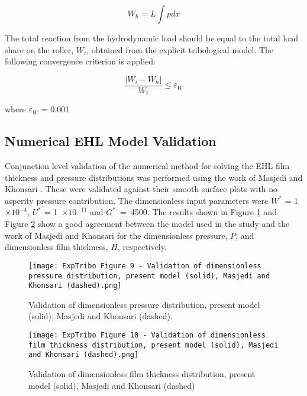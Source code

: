 \begin{enumerate}
	\begin{equation}\label{Reaction load integration EHL}
		W_h=L \int p d x
	\end{equation}

	The total reaction from the hydrodynamic load should be equal to the total load share on the roller, $W_i$, obtained from the explicit tribological model. The following convergence criterion is applied:
	
	\begin{equation}
		\frac{\left|W_i-W_h\right|}{W_i} \leq \varepsilon_W
	\end{equation}

	where $\varepsilon_W$ = 0.001 
\end{enumerate}

\subsection{Numerical EHL Model Validation}
Conjunction level validation of the numerical method for solving the EHL film thickness and pressure distributions was performed using the work of Masjedi and Khonsari \cite{Masjedi2012}. These were validated against their smooth surface plots with no asperity pressure contribution. The dimensionless input parameters were $W^*$ = 1~$\times 10^{-4}$, $U^*$ = 1~$\times 10^{-11}$ and $G^*$~=~4500. The results shown in Figure \ref{EHL Pressure Validation Masjedi Khonsari} and Figure \ref{EHL Film Validation Masjedi Khonsari} show a good agreement between the model used in the study and the work of Masjedi and Khonsari for the dimensionless pressure, $P$, and dimensionless film thickness, $H$, respectively.

\begin{figure}
	\centerline{\texttt{[image: ExpTribo Figure 9 - Validation of dimensionless pressure distribution, present model (solid), Masjedi and Khonsari (dashed).png]}}
	\caption{Validation of dimensionless pressure distribution, present model (solid), Masjedi and Khonsari (dashed).}
	\label{EHL Pressure Validation Masjedi Khonsari}
\end{figure}

\begin{figure}
	\centerline{\texttt{[image: ExpTribo Figure 10 - Validation of dimensionless film thickness distribution, present model (solid), Masjedi and Khonsari (dashed).png]}}
	\caption{Validation of dimensionless film thickness distribution, present model (solid), Masjedi and Khonsari (dashed)}
	\label{EHL Film Validation Masjedi Khonsari}
\end{figure}

